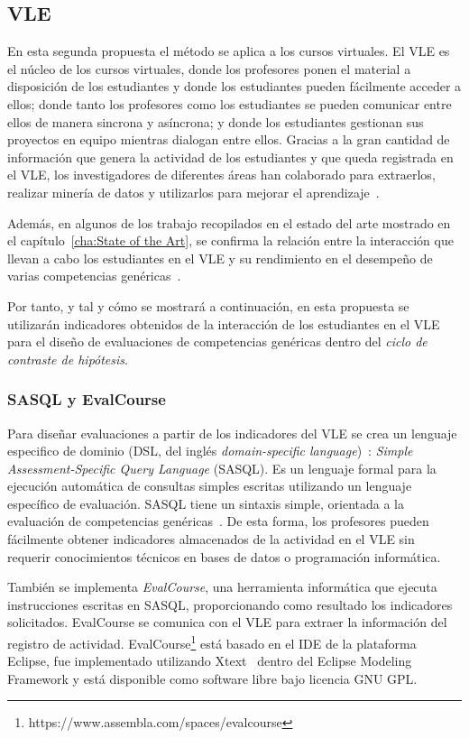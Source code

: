 \subsection{VLE}

En esta segunda propuesta el método se aplica a los cursos virtuales. El VLE es el núcleo de los cursos virtuales, donde los profesores ponen el material a disposición de los estudiantes y donde los estudiantes pueden fácilmente acceder a ellos; donde tanto los profesores como los estudiantes se pueden comunicar entre ellos de manera sincrona y asíncrona; y donde los estudiantes gestionan sus proyectos en equipo mientras dialogan entre ellos. Gracias a la gran cantidad de información que genera la actividad de los estudiantes y que queda registrada en el VLE, los investigadores de diferentes áreas han colaborado para extraerlos, realizar minería de datos y utilizarlos para mejorar el aprendizaje~\cite{park2015development}.

Además, en algunos de los trabajo recopilados en el estado del arte mostrado en el capítulo~\ref{cha:State of the Art}, se confirma la relación entre la interacción que llevan a cabo los estudiantes en el VLE y su rendimiento en el desempeño de varias competencias genéricas~\cite{fidalgo:2015,rayon2014web}. 

Por tanto, y tal y cómo se mostrará a continuación, en esta propuesta se utilizarán indicadores obtenidos de la interacción de los estudiantes en el VLE para el diseño de evaluaciones de competencias genéricas dentro del  \emph{ciclo de contraste de hipótesis}.


\subsubsection{SASQL y EvalCourse}

Para diseñar evaluaciones a partir de los indicadores del VLE se crea un lenguaje especifico de dominio (DSL, del inglés \emph{domain-specific language})~\cite{vanDeursen:2000}: \emph{Simple Assessment-Specific Query Language} (SASQL). Es un lenguaje formal para la ejecución automática de consultas simples escritas utilizando un lenguaje específico de evaluación. SASQL tiene un sintaxis simple, orientada a la evaluación de competencias genéricas~\cite{Balderas:2013}. De esta forma, los profesores pueden fácilmente obtener indicadores almacenados de la actividad en el VLE sin requerir conocimientos técnicos en bases de datos o programación informática.

También se implementa \emph{EvalCourse}, una herramienta informática que ejecuta instrucciones escritas en SASQL, proporcionando como resultado los indicadores solicitados. EvalCourse se comunica con el VLE para extraer la información del registro de actividad. EvalCourse\footnote{https://www.assembla.com/spaces/evalcourse} está basado en el IDE de la plataforma Eclipse, fue implementado utilizando Xtext~\cite{eysholdt2010xtext} dentro del Eclipse Modeling Framework y está disponible como software libre bajo licencia GNU GPL.

